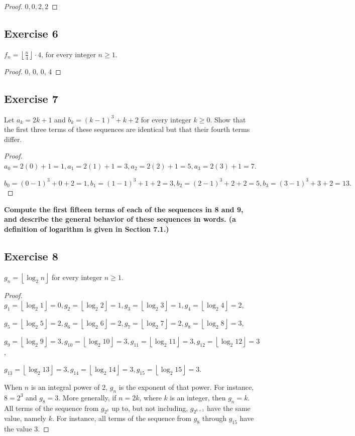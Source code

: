 \documentclass[14pt]{extarticle}
\newcommand{\dps}{\displaystyle}
\newcommand{\floor}[1]{{\left\lfloor#1\right\rfloor}}
\newcommand{\cy}{\color{cyan}}
\begin{document}
\begin{proof}
$0, 0, 2, 2$
\end{proof}

\subsection{Exercise 6}
$\dps f_n  = \floor{\frac{n}{4}}\cdot 4$, for every integer $n \geq 1$.

\begin{proof}
0, 0, 0, 4
\end{proof}

\subsection{Exercise 7}
Let $a_k = 2k + 1$ and $b_k = (k - 1)^3 + k + 2$ for every integer $k \geq 0$. Show that the first three terms of these sequences are identical but that their fourth terms differ.

\begin{proof}
$a_0 = 2(0) + 1 = 1, a_1 = 2(1) + 1 = 3, a_2 = 2(2) + 1 = 5, a_3 = 2(3) + 1 = 7$.

$b_0 = (0-1)^3 + 0 + 2 = 1, b_1 = (1-1)^3 + 1 + 2 = 3, b_2 = (2-1)^3 + 2 + 2 = 5, b_3 = (3-1)^3 + 3 + 2 = 13.$
\end{proof}

{\bf\cy Compute the first fifteen terms of each of the sequences in 8 and 9, and describe the general behavior of these sequences in words. (a definition of logarithm is given in Section 7.1.)}

\subsection{Exercise 8}
$g_n = \floor{\log_2 n}$ for every integer $n \geq 1$.

\begin{proof}
$g_1 = \floor{\log_2 1} = 0, g_2 = \floor{\log_2 2} = 1, g_3 = \floor{\log_2 3} = 1, g_4 = \floor{\log_2 4} = 2$,

$g_5 = \floor{\log_2 5} = 2, g_6 = \floor{\log_2 6} = 2, g_7 = \floor{\log_2 7} = 2, g_8 = \floor{\log_2 8} = 3$, 

$g_9 = \floor{\log_2 9} = 3, g_{10} = \floor{\log_2 10} = 3, g_{11} = \floor{\log_2 11} = 3, g_{12} = \floor{\log_2 12} = 3$, 

$g_{13} = \floor{\log_2 13} = 3, g_{14} = \floor{\log_2 14} = 3, g_{15} = \floor{\log_2 15} = 3$.

When $n$ is an integral power of 2, $g_n$ is the exponent of that power. For instance, $8 = 2^3$ and $g_8 = 3$. More generally, if $n = 2k$, where $k$ is an integer, then $g_n = k$. All terms of the sequence from $g_{2^k}$ up to, but not including, $g_{2^{k+1}}$ have the same value, namely $k$. For instance, all terms of the sequence from $g_8$ through $g_{15}$ have the value 3.
\end{proof}
\end{document}
